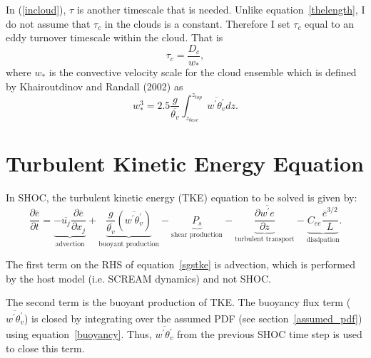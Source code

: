 \documentclass[12pt,titlepage]{article}
\numberwithin{equation}{section}
\begin{document}
In (\ref{incloud}), $\tau$ is another timescale that is needed.  Unlike equation~\ref{thelength}, I do not assume that $\tau_{c}$ in the clouds is a constant.  Therefore I set $\tau_{c}$ equal to an eddy turnover timescale within the cloud.  That is
%
\begin{equation}
  \tau_{c}=\frac{D_{c}}{w_{*}} , 
  \label{tscale_cloud}
\end{equation}
%
where $w_{*}$ is the convective velocity scale for the cloud ensemble which is defined by Khairoutdinov and Randall (2002) as 
%
\begin{equation}
  w_{*}^{3}=2.5\frac{g}{\overline{\theta_{v}}} \int_{z_{base}}^{z_{top}} \overline{w^{'}\theta_{v}^{'}} dz .   
  \label{wstar_cloud}
\end{equation}

\section{Turbulent Kinetic Energy Equation}
\label{tke_equation}

In SHOC, the turbulent kinetic energy (TKE) equation to be solved is given by:
%
\begin{equation}
  \frac{\partial{\overline{e}}}{\partial{t}}=\underbrace{-\overline{u_{j}}\frac{\partial{\overline{e}}}{\partial{x_{j}}}}_\text{advection}+\underbrace{\frac{g}{\overline{\theta_{v}}}\left(\overline{w^{'}\theta_{v}^{'}}\right)}_\text{buoyant production}-\underbrace{P_{s}}_\text{shear production}-\underbrace{\frac{\partial{\overline{w^{'}e}}}{\partial{z}}}_\text{turbulent transport}-\underbrace{C_{ee}\frac{\overline{e}^{3/2}}{L}}_\text{dissipation} .  
  \label{sgstke}
\end{equation}

The first term on the RHS of equation~\ref{sgstke} is advection, which is performed by the host model (i.e. SCREAM dynamics) and not SHOC.  

The second term is the buoyant production of TKE.  The buoyancy flux term ($\overline{w^{'}\theta_{v}^{'}}$) is closed by integrating over the assumed PDF (see section~\ref{assumed_pdf}) using equation~\ref{buoyancy}.  Thus, $\overline{w^{'}\theta_{v}^{'}}$ from the previous SHOC time step is used to close this term.  
\end{document}
